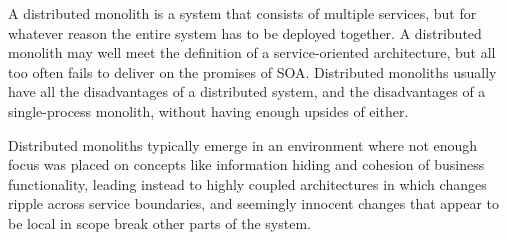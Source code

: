 A distributed monolith is a system that consists of multiple services, but for whatever reason the entire system has to be deployed together. A distributed monolith may well meet the definition of a service-oriented architecture, but all too often fails to deliver on the promises of SOA. Distributed monoliths usually have all the disadvantages of a distributed system, and the disadvantages of a single-process monolith, without having enough upsides of either. \cite{MON_TO_MS_MONOLITH}

Distributed monoliths typically emerge in an environment where not enough focus was placed on concepts like information hiding and cohesion of business functionality, leading instead to highly coupled architectures in which changes ripple across service boundaries, and seemingly innocent changes that appear to be local in scope break other parts of the system.  \cite{MON_TO_MS_MONOLITH}

